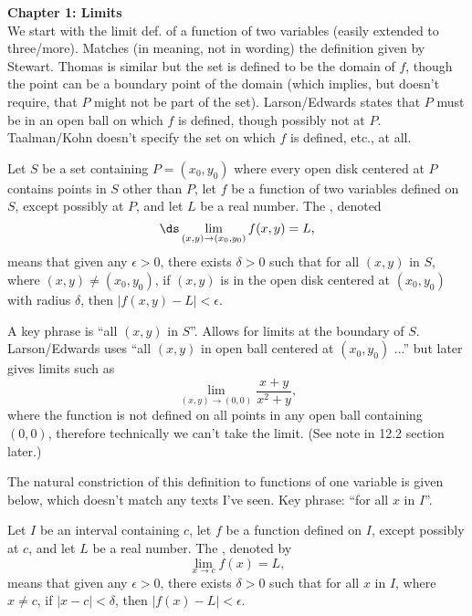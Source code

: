 \documentclass{article}
\begin{document}
\noindent\large\textbf{Chapter 1: Limits}\normalsize\\

We start with the limit def. of a function of two variables (easily extended to three/more). Matches (in meaning, not in wording) the definition given by Stewart. Thomas is similar but the set is defined to be the domain of $f$, though the point can be a boundary point of the domain (which implies, but doesn't require, that $P$ might not be part of the set). Larson/Edwards states that $P$ must be in an open ball on which $f$ is defined, though possibly not at $P$. Taalman/Kohn doesn't specify the set on which $f$ is defined, etc., at all. 

{Let $S$ be a set containing $P=(x_0,y_0)$ where every open disk centered at $P$ contains points in $S$ other than $P$, let $f$ be a function of two variables defined on $S$, except possibly at $P$, and let $L$ be a real number. 
The , denoted $$\ds \lim_{(x,y)\to (x_0,y_0)} f(x,y) = L,$$
means that given any $\epsilon>0$, there exists $\delta>0$ such that for all  $(x,y)$ in $S$, where $(x,y)\neq (x_0,y_0)$, if $(x,y)$ is in the open disk centered at $(x_0,y_0)$ with radius $\delta$, then $|f(x,y) - L|<\epsilon.$
}


A key phrase is ``all $(x,y)$ in $S$''. Allows for limits at the boundary of $S$. Larson/Edwards uses ``all $(x,y)$ in open ball centered at $(x_0,y_0)$ ...'' but later gives limits such as
$$\lim_{(x,y)\to (0,0)} \frac{x+y}{x^2+y},$$
where the function is not defined on all points in any open ball containing $(0,0)$, therefore technically we can't take the limit. (See note in 12.2 section later.)

The natural constriction of this definition to functions of one variable is given below, which doesn't match any texts I've seen. Key phrase: ``for all $x$ in $I$''.

{Let $I$ be an interval containing $c$, let $f$ be a function defined on $I$, except possibly at $c$, and let $L$ be a real number. The , denoted by  
$$\displaystyle \lim_{x\rightarrow c} f(x) = L,$$
means that given any $\epsilon > 0$, there exists $\delta > 0$ such that for all $x$ in $I$, where $x\neq c$,  
if  $|x - c| < \delta$, then $|f(x) - L| < \epsilon$.
}
\end{document}

